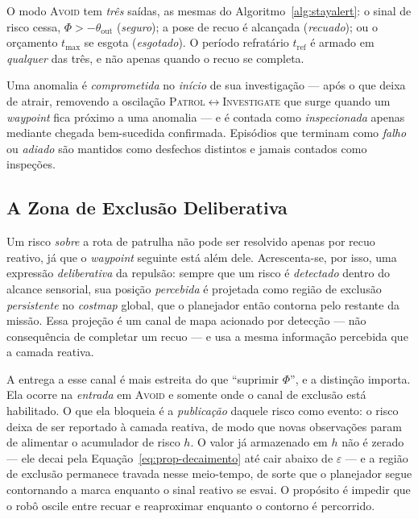 O modo \textsc{Avoid} tem \emph{três} saídas, as mesmas do
Algoritmo~\ref{alg:stayalert}: o sinal de risco cessa, $\Phi > -\theta_{\text{out}}$
(\emph{seguro}); a pose de recuo é alcançada (\emph{recuado}); ou o orçamento
$t_{\max}$ se esgota (\emph{esgotado}). O período refratário $t_{\text{ref}}$ é armado
em \emph{qualquer} das três, e não apenas quando o recuo se completa.

Uma anomalia é \emph{comprometida} no \emph{início} de sua investigação --- após o
que deixa de atrair, removendo a oscilação
\textsc{Patrol}$\leftrightarrow$\textsc{Investigate} que surge quando um
\textit{waypoint} fica próximo a uma anomalia --- e é contada como
\emph{inspecionada} apenas mediante chegada bem-sucedida confirmada. Episódios que
terminam como \emph{falho} ou \emph{adiado} são mantidos como desfechos distintos e
jamais contados como inspeções.

\subsection{A Zona de Exclusão Deliberativa}
\label{sec:prop-keepout}

Um risco \emph{sobre} a rota de patrulha não pode ser resolvido apenas por recuo
reativo, já que o \textit{waypoint} seguinte está além dele. Acrescenta-se, por isso,
uma expressão \emph{deliberativa} da repulsão: sempre que um risco é \emph{detectado}
dentro do alcance sensorial, sua posição \emph{percebida} é projetada como região de
exclusão \emph{persistente} no \textit{costmap} global, que o planejador então
contorna pelo restante da missão. Essa projeção é um canal de mapa acionado por
detecção --- não consequência de completar um recuo --- e usa a mesma informação
percebida que a camada reativa.

A entrega a esse canal é mais estreita do que ``suprimir $\Phi$'', e a distinção
importa. Ela ocorre na \emph{entrada} em \textsc{Avoid} e somente onde o canal de
exclusão está habilitado. O que ela bloqueia é a \emph{publicação} daquele risco como
evento: o risco deixa de ser reportado à camada reativa, de modo que novas
observações param de alimentar o acumulador de risco $h$. O valor já armazenado em
$h$ não é zerado --- ele decai pela Equação~\eqref{eq:prop-decaimento} até cair abaixo
de $\varepsilon$ --- e a região de exclusão permanece travada nesse meio-tempo, de
sorte que o planejador segue contornando a marca enquanto o sinal reativo se esvai. O
propósito é impedir que o robô oscile entre recuar e reaproximar enquanto o contorno é
percorrido.

